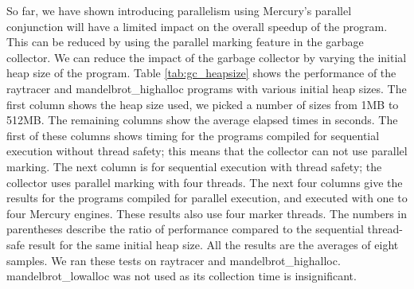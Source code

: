 


So far,
we have shown introducing parallelism using Mercury's parallel conjunction
will have a limited impact on the overall speedup of the program.
This can be reduced by using the parallel marking feature in the garbage
collector.
We can reduce the impact of the garbage collector by varying the initial
heap size of the program.
Table \ref{tab:gc_heapsize} shows the performance of the raytracer and
mandelbrot\_highalloc programs with various initial heap sizes.
The first column shows the heap size used,
we picked a number of sizes from 1MB to 512MB.
The remaining columns show the average elapsed times in seconds.
The first of these columns shows timing for the programs compiled for
sequential execution without thread safety;
this means that the collector can not use parallel marking.
The next column is for sequential execution with thread safety;
the collector uses parallel marking with four threads.
The next four columns give the results for the programs compiled for
parallel execution, and executed with one to four Mercury engines.
These results also use four marker threads.
The numbers in parentheses describe the ratio of performance compared to the
sequential thread-safe result for the same initial heap size.
All the results are the averages of eight samples.
We ran these tests on raytracer and mandelbrot\_highalloc.
mandelbrot\_lowalloc was not used as its collection time is insignificant.

